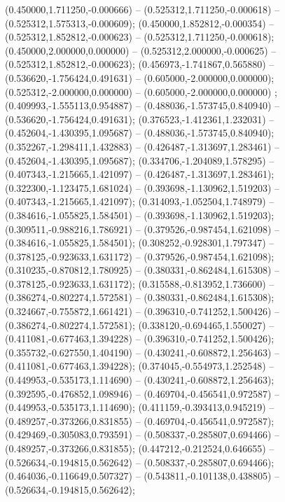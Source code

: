  (0.450000,1.711250,-0.000666) -- (0.525312,1.711250,-0.000618) -- (0.525312,1.575313,-0.000609);
 (0.450000,1.852812,-0.000354) -- (0.525312,1.852812,-0.000623) -- (0.525312,1.711250,-0.000618);
 (0.450000,2.000000,0.000000) -- (0.525312,2.000000,-0.000625) -- (0.525312,1.852812,-0.000623);
 (0.456973,-1.741867,0.565880) -- (0.536620,-1.756424,0.491631) -- (0.605000,-2.000000,0.000000);
 (0.525312,-2.000000,0.000000) -- (0.605000,-2.000000,0.000000) ;
 (0.409993,-1.555113,0.954887) -- (0.488036,-1.573745,0.840940) -- (0.536620,-1.756424,0.491631);
 (0.376523,-1.412361,1.232031) -- (0.452604,-1.430395,1.095687) -- (0.488036,-1.573745,0.840940);
 (0.352267,-1.298411,1.432883) -- (0.426487,-1.313697,1.283461) -- (0.452604,-1.430395,1.095687);
 (0.334706,-1.204089,1.578295) -- (0.407343,-1.215665,1.421097) -- (0.426487,-1.313697,1.283461);
 (0.322300,-1.123475,1.681024) -- (0.393698,-1.130962,1.519203) -- (0.407343,-1.215665,1.421097);
 (0.314093,-1.052504,1.748979) -- (0.384616,-1.055825,1.584501) -- (0.393698,-1.130962,1.519203);
 (0.309511,-0.988216,1.786921) -- (0.379526,-0.987454,1.621098) -- (0.384616,-1.055825,1.584501);
 (0.308252,-0.928301,1.797347) -- (0.378125,-0.923633,1.631172) -- (0.379526,-0.987454,1.621098);
 (0.310235,-0.870812,1.780925) -- (0.380331,-0.862484,1.615308) -- (0.378125,-0.923633,1.631172);
 (0.315588,-0.813952,1.736600) -- (0.386274,-0.802274,1.572581) -- (0.380331,-0.862484,1.615308);
 (0.324667,-0.755872,1.661421) -- (0.396310,-0.741252,1.500426) -- (0.386274,-0.802274,1.572581);
 (0.338120,-0.694465,1.550027) -- (0.411081,-0.677463,1.394228) -- (0.396310,-0.741252,1.500426);
 (0.355732,-0.627550,1.404190) -- (0.430241,-0.608872,1.256463) -- (0.411081,-0.677463,1.394228);
 (0.374045,-0.554973,1.252548) -- (0.449953,-0.535173,1.114690) -- (0.430241,-0.608872,1.256463);
 (0.392595,-0.476852,1.098946) -- (0.469704,-0.456541,0.972587) -- (0.449953,-0.535173,1.114690);
 (0.411159,-0.393413,0.945219) -- (0.489257,-0.373266,0.831855) -- (0.469704,-0.456541,0.972587);
 (0.429469,-0.305083,0.793591) -- (0.508337,-0.285807,0.694466) -- (0.489257,-0.373266,0.831855);
 (0.447212,-0.212524,0.646655) -- (0.526634,-0.194815,0.562642) -- (0.508337,-0.285807,0.694466);
 (0.464036,-0.116649,0.507327) -- (0.543811,-0.101138,0.438805) -- (0.526634,-0.194815,0.562642);
